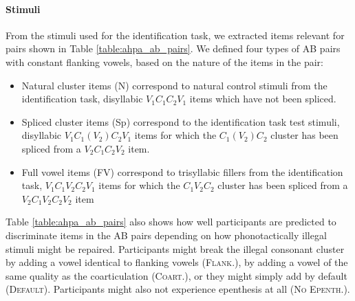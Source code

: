 \paragraph{Stimuli}
From the stimuli used for the identification task, we extracted items relevant for pairs shown in Table \ref{table:ahpa_ab_pairs}.
We defined four types of AB pairs with constant flanking vowels, based on the nature of the items in the pair:

\begin{itemize}
\item Natural cluster items (N) correspond to natural control stimuli from the identification task, disyllabic $V_{1}C_{1}C_{2}V_{1}$ items which have not been spliced.
\item Spliced cluster items (Sp) correspond to the identification task test stimuli, disyllabic $V_{1}C_{1}(V_{2})C_{2}V_{1}$ items for which the $C_{1}(V_{2})C_{2}$ cluster has been spliced from a $V_{2}C_{1}C_{2}V_{2}$ item.
  \item Full vowel items (FV) correspond to trisyllabic fillers from the identification task, $V_{1}C_{1}V_{2}C_{2}V_{1}$ items for which the $C_{1}V_{2}C_{2}$ cluster has been spliced from a $V_{2}C_{1}V_{2}C_{2}V_{2}$ item
\end{itemize}

Table \ref{table:ahpa_ab_pairs} also shows how well participants are predicted to discriminate items in the AB pairs depending on how phonotactically illegal stimuli might be repaired. Participants might break the illegal consonant cluster by adding a vowel identical to flanking vowels (\textsc{Flank.}), by adding a vowel of the same quality as the coarticulation (\textsc{Coart.}), or they might simply add  by default (\textsc{Default}). Participants might also not experience epenthesis at all (\textsc{No Epenth.}).   

